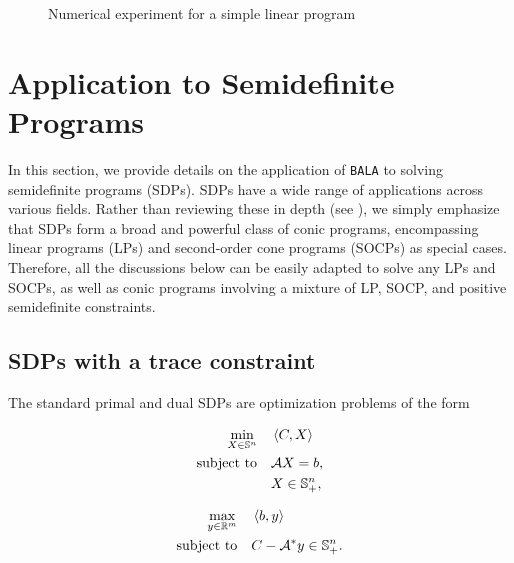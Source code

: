 \documentclass[11pt]{article}
\newcommand{\alg}{\texttt{BALA}}%
\begin{document}
\begin{figure}[t]
     \centering
\caption{Numerical experiment for a simple linear program}
\label{fig:Illustration}
\end{figure}

\section{Application to Semidefinite Programs} 
\label{section-application-SDP}
In this section, we provide details on the application of \alg{} to solving semidefinite programs (SDPs). SDPs have a wide range of applications across various fields. Rather than reviewing these in depth (see \cite{wolkowicz2012handbook}), we simply emphasize that SDPs form a broad and powerful class of conic programs, encompassing linear programs (LPs) and second-order cone programs (SOCPs) as special cases. Therefore, all the discussions below can be easily adapted to solve any LPs and SOCPs, as well as conic programs involving a mixture of LP, SOCP, and positive semidefinite constraints.  

\subsection{SDPs with a trace constraint} \label{appendix:trace-SDP}
The standard primal and dual SDPs are optimization problems of the form 

\begin{minipage}{0.44\textwidth}
\begin{equation}
    \label{eq:primal-sdp}
    \begin{aligned}
        \min_{X \in \mathbb{S}^n } & \quad \left \langle C, X \right\rangle \\\mathrm{subject~to} & \quad \mathcal{A} X = b, \\
        & \quad X \in \mathbb{S}^n_+,
    \end{aligned}
\end{equation}
\end{minipage}
\begin{minipage}{0.49\textwidth}
\begin{equation}
    \label{eq:dual-sdp}
    \begin{aligned}
        \max_{y \in \mathbb{R}^m} & \quad \left \langle b, y \right\rangle \\\mathrm{subject~to} & \quad  C - \mathcal{A}^* y  \in \mathbb{S}^n_+.
    \end{aligned}
\end{equation}
\end{minipage}
\end{document}
